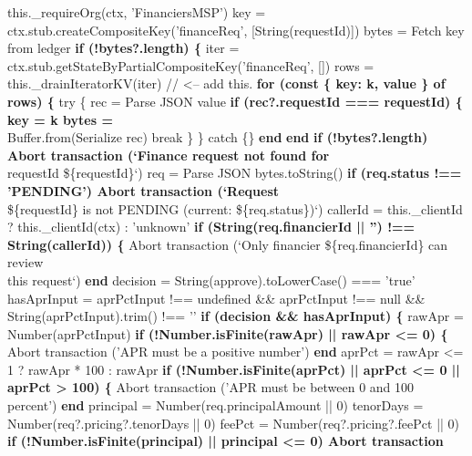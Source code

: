 \documentclass[12pt]{article}
\begin{document}
\begin{algorithm}[H]
\caption{reviewFinanceRequest() (Part 1 of 3)}
this.\_requireOrg(ctx, 'FinanciersMSP')\;
key = ctx.stub.createCompositeKey('financeReq', [String(requestId)])\;
bytes = Fetch key from ledger\;
\textbf{if (!bytes?.length) \{}\;
iter = ctx.stub.getStateByPartialCompositeKey('financeReq', [])\;
rows = this.\_drainIteratorKV(iter) // <-- add this.\;
\textbf{for (const \{ key: k, value \} of rows) \{}\;
try \{\;
rec = Parse JSON value\;
\textbf{if (rec?.requestId === requestId) \{ key = k bytes =}\\
\quad Buffer.from(Serialize rec) break \}\;
\} catch \{\}\;
\textbf{end}\;
\textbf{end}\;
\textbf{if (!bytes?.length) Abort transaction (`Finance request not found for}\\
\quad requestId \$\{requestId\}`)\;
req = Parse JSON bytes.toString()\;
\textbf{if (req.status !== 'PENDING') Abort transaction (`Request}\\
\quad \$\{requestId\} is not PENDING (current: \$\{req.status\})`)\;
callerId = this.\_clientId ? this.\_clientId(ctx) : 'unknown'\;
\textbf{if (String(req.financierId || '') !== String(callerId)) \{}\;
Abort transaction (`Only financier \$\{req.financierId\} can review\\
\quad this request`)\;
\textbf{end}\;
decision = String(approve).toLowerCase() === 'true'\;
hasAprInput = aprPctInput !== undefined \&\& aprPctInput !== null \&\&\\
\quad String(aprPctInput).trim() !== ''\;
\textbf{if (decision \&\& hasAprInput) \{}\;
rawApr = Number(aprPctInput)\;
\textbf{if (!Number.isFinite(rawApr) || rawApr <= 0) \{}\;
Abort transaction ('APR must be a positive number')\;
\textbf{end}\;
aprPct = rawApr <= 1 ? rawApr * 100 : rawApr\;
\textbf{if (!Number.isFinite(aprPct) || aprPct <= 0 || aprPct > 100) \{}\;
Abort transaction ('APR must be between 0 and 100 percent')\;
\textbf{end}\;
principal = Number(req.principalAmount || 0)\;
tenorDays = Number(req?.pricing?.tenorDays || 0)\;
feePct = Number(req?.pricing?.feePct || 0)\;
\textbf{if (!Number.isFinite(principal) || principal <= 0) Abort transaction}\\
\end{algorithm}
\end{document}
